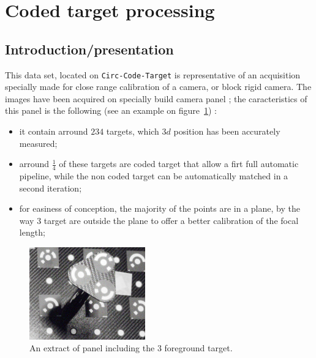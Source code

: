 
\section{Coded target processing}


\subsection{Introduction/presentation}

This data set, located on {\tt Circ-Code-Target} is representative of an acquisition specially made for close 
range calibration of a camera, or block rigid camera.  The images have been
acquired on specially build camera panel ; the caracteristics of this panel
is the following (see an example on figure~\ref{fig:CodeT:Panel}) :
 

\begin{itemize}
     \item it contain arround $234$ targets, which $3d$ position has been accurately measured;

     \item arround $\frac{1}{4}$ of these targets are coded target that allow a firt full automatic pipeline,
           while the non coded target can  be automatically matched in a second iteration;

     \item for easiness of conception,  the majority of the points are in a plane, by the way $3$ target
           are outside the plane  to offer a better calibration of the focal length;
\end{itemize}


\begin{figure}
\centering
	\includegraphics[width=5cm]{Tutorial/Images/Perche.jpg}
	\caption{An extract of panel including the $3$ foreground target.}
\label{fig:CodeT:Panel}
\end{figure}


